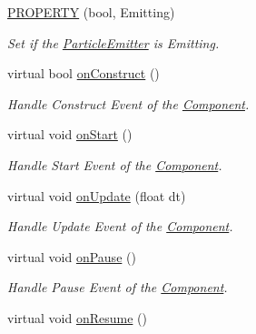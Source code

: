 \begin{DoxyCompactItemize}
\hyperlink{class_i_dream_sky_1_1_particle_emitter_aeca5658cbce6b7541f7d52d81dbe21b9}{P\+R\+O\+P\+E\+R\+TY} (bool, Emitting)
\begin{DoxyCompactList}\small\item\em Set if the \hyperlink{class_i_dream_sky_1_1_particle_emitter}{Particle\+Emitter} is Emitting. \end{DoxyCompactList}\item 
virtual bool \hyperlink{class_i_dream_sky_1_1_particle_emitter_a4332986f229caea5ba4c5dfe29d97a93}{on\+Construct} ()
\begin{DoxyCompactList}\small\item\em Handle Construct Event of the \hyperlink{class_i_dream_sky_1_1_component}{Component}. \end{DoxyCompactList}\item 
virtual void \hyperlink{class_i_dream_sky_1_1_particle_emitter_a7befe16b4fce5462b47ffeb6d4b6b13a}{on\+Start} ()\hypertarget{class_i_dream_sky_1_1_particle_emitter_a7befe16b4fce5462b47ffeb6d4b6b13a}{}\label{class_i_dream_sky_1_1_particle_emitter_a7befe16b4fce5462b47ffeb6d4b6b13a}

\begin{DoxyCompactList}\small\item\em Handle Start Event of the \hyperlink{class_i_dream_sky_1_1_component}{Component}. \end{DoxyCompactList}\item 
virtual void \hyperlink{class_i_dream_sky_1_1_particle_emitter_a52ef385a6d4b1df98e92db676b6316ae}{on\+Update} (float dt)
\begin{DoxyCompactList}\small\item\em Handle Update Event of the \hyperlink{class_i_dream_sky_1_1_component}{Component}. \end{DoxyCompactList}\item 
virtual void \hyperlink{class_i_dream_sky_1_1_particle_emitter_a216658e7d1532d91c86d8f235524c44c}{on\+Pause} ()\hypertarget{class_i_dream_sky_1_1_particle_emitter_a216658e7d1532d91c86d8f235524c44c}{}\label{class_i_dream_sky_1_1_particle_emitter_a216658e7d1532d91c86d8f235524c44c}

\begin{DoxyCompactList}\small\item\em Handle Pause Event of the \hyperlink{class_i_dream_sky_1_1_component}{Component}. \end{DoxyCompactList}\item 
virtual void \hyperlink{class_i_dream_sky_1_1_particle_emitter_a6a9fb6790359865382adfc3aecb2dae6}{on\+Resume} ()\hypertarget{class_i_dream_sky_1_1_particle_emitter_a6a9fb6790359865382adfc3aecb2dae6}{}\label{class_i_dream_sky_1_1_particle_emitter_a6a9fb6790359865382adfc3aecb2dae6}


\end{DoxyCompactItemize}
